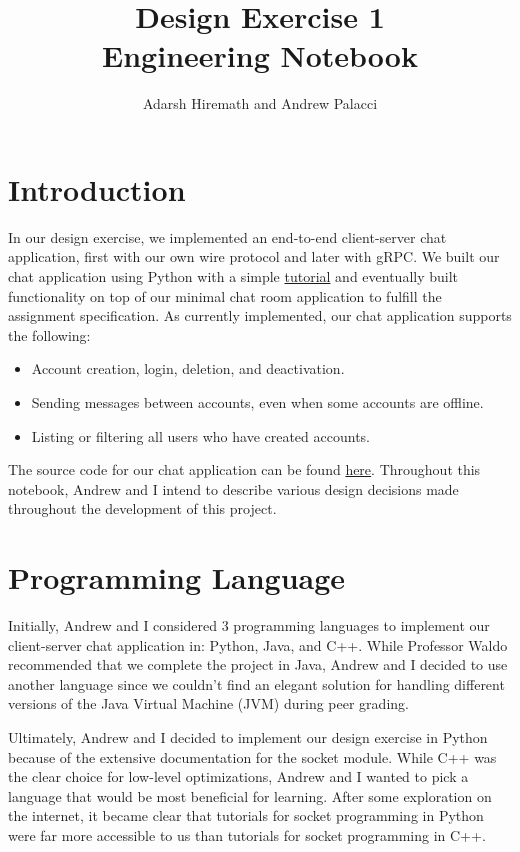 \documentclass[
	a4paper, %
	10pt, %
	unnumberedsections, %
	twoside, %
]{LTJournalArticle}
\title{Design Exercise 1\\ Engineering Notebook} %
\author{%
	Adarsh Hiremath and Andrew Palacci
}
\begin{document}
\maketitle %


\section{Introduction}
In our design exercise, we implemented an end-to-end client-server chat application, first with our own wire protocol and later with gRPC. We built our chat application using Python with a simple \href{https://www.geeksforgeeks.org/simple-chat-room-using-python/}{tutorial} and eventually built functionality on top of our minimal chat room application to fulfill the assignment specification. As currently implemented, our chat application supports the following: 
\begin{itemize}
    \item Account creation, login, deletion, and deactivation. 
    \item Sending messages between accounts, even when some accounts are offline. 
    \item Listing or filtering all users who have created accounts. 
\end{itemize}

The source code for our chat application can be found \href{https://github.com/ahiremathh/chat_protocol}{here}. Throughout this notebook, Andrew and I intend to describe various design decisions made throughout the development of this project. 

\section{Programming Language}
Initially, Andrew and I considered 3 programming languages to implement our client-server chat application in: Python, Java, and C++. While Professor Waldo recommended that we complete the project in Java, Andrew and I decided to use another language since we couldn't find an elegant solution for handling different versions of the Java Virtual Machine (JVM) during peer grading. 

Ultimately, Andrew and I decided to implement our design exercise in Python because of the extensive documentation for the socket module. While C++ was the clear choice for low-level optimizations, Andrew and I wanted to pick a language that would be most beneficial for learning. After some exploration on the internet, it became clear that tutorials for socket programming in Python were far more accessible to us than tutorials for socket programming in C++. 
\end{document}

